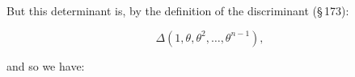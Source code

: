 But this determinant is, by the definition of the discriminant (\S\,173):

\[
\Delta(1, \theta, \theta^2, \ldots, \theta^{n-1}),
\]

and so we have:

